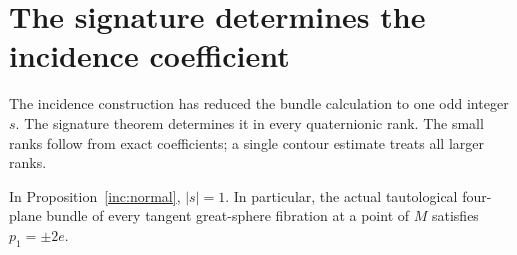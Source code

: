 \section{The signature determines the incidence coefficient}
\label{sig:section}

The incidence construction has reduced the bundle calculation to
one odd integer $s$. The signature theorem determines it in every
quaternionic rank. The small ranks follow from exact coefficients;
a single contour estimate treats all larger ranks.

\begin{theorem}\label{sig:coefficient}
In Proposition~\ref{inc:normal}, $|s|=1$. In particular, the
actual tautological four-plane bundle of every tangent great-sphere
fibration at a point of $M$ satisfies $p_1=\pm2e$.
\end{theorem}

